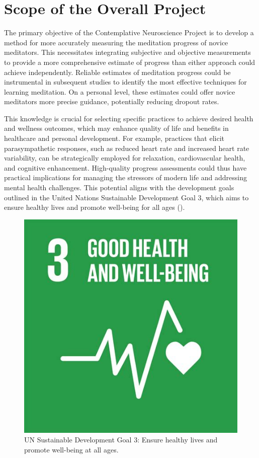 

\section{Scope of the Overall Project}

The primary objective of the Contemplative Neuroscience Project is to develop a method for more accurately measuring the meditation progress of novice meditators. This necessitates integrating subjective and objective measurements to provide a more comprehensive estimate of progress than either approach could achieve independently. Reliable estimates of meditation progress could be instrumental in subsequent studies to identify the most effective techniques for learning meditation. On a personal level, these estimates could offer novice meditators more precise guidance, potentially reducing dropout rates.

This knowledge is crucial for selecting specific practices to achieve desired health and wellness outcomes, which may enhance quality of life and benefits in healthcare and personal development. For example, practices that elicit parasympathetic responses, such as reduced heart rate and increased heart rate variability, can be strategically employed for relaxation, cardiovascular health, and cognitive enhancement. High-quality progress assessments could thus have practical implications for managing the stressors of modern life and addressing mental health challenges. This potential aligns with the development goals outlined in the United Nations Sustainable Development Goal 3, which aims to ensure healthy lives and promote well-being for all ages (\cite{UN_SDG3_2023}).

\begin{figure}[h!]
    \centering
    \includegraphics[width=0.3\linewidth]{Figures/goal3.jpg}
    \caption{UN Sustainable Development Goal 3: Ensure healthy lives and promote well-being at all ages.}
    \label{fig:goal3}
\end{figure}

